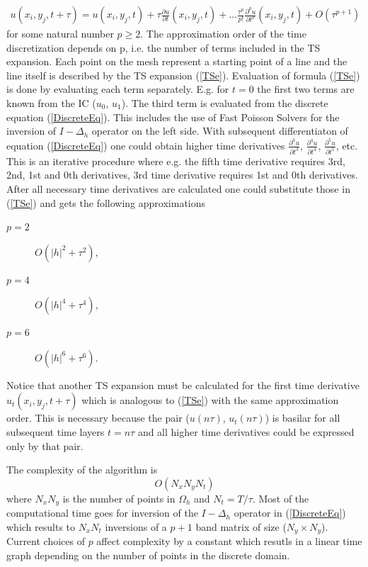 \documentclass[%
 aip,
cp,  %
 amsmath,amssymb,%
 reprint,%
]{revtex4-2}
\newcommand{\rf}[1]{(\ref{#1})}
\begin{document}
\begin{align} \label{TSe}
u(x_i, y_j, t+\tau) = u(x_i, y_j, t) + \tau \frac{ \partial u }{ \partial t }(x_i, y_j, t)  + ... 
\frac{ \tau^p }{ p! } \frac{ \partial^p u }{ \partial t^p }(x_i, y_j, t) + O(\tau^{p+1})
\end{align}
for some natural number $p \ge 2$. The approximation order of the time discretization depends on p, i.e. the number of terms included in the TS expansion. Each point on the mesh represent a starting point of a line and the line itself is described by the TS expansion \rf{TSe}. Evaluation of formula \rf{TSe} is done by evaluating each term separately. E.g. for $t=0$ the first two terms are known from the IC ($u_0$, $u_1$). The third term is evaluated from the discrete equation \rf{DiscreteEq}. This includes the use of Fast Poisson Solvers for the inversion of $I-\Delta_h$ operator on the left side. With subsequent differentiaton of equation \rf{DiscreteEq} one could obtain higher time derivatives $\frac{\partial^3 u}{\partial t^3}$, $\frac{\partial^4 u}{\partial t^4}$, $\frac{\partial^5 u}{\partial t^5}$, etc. This is an iterative procedure where e.g. the fifth time derivative requires 3rd, 2nd, 1st and 0th derivatives, 3rd time derivative requires 1st and 0th derivatives. After all necessary time derivatives are calculated one could substitute those in \rf{TSe} and gets the following approximations
\begin{description}
 \item[$p=2$] $O(|h|^2 + \tau^2)$,
 \item[$p=4$] $O(|h|^4 + \tau^4)$,
 \item[$p=6$] $O(|h|^6 + \tau^6)$.
\end{description}
Notice that another TS expansion must be calculated for the first time derivative $u_t(x_i, y_j, t+\tau)$ which is analogous to \rf{TSe} with the same approximation order. This is necessary because the pair ($u(n\tau)$, $u_t(n\tau)$) is basilar for all subsequent time layers $t=n\tau$ and all higher time derivatives could be expressed only by that pair.

The complexity of the algorithm is
$$ O( N_x N_y N_t ) $$
where $N_x N_y$ is the number of points in $\Omega_h$ and $N_t = T/\tau$. Most of the computational time goes for inversion of the $I-\Delta_h$ operator in \rf{DiscreteEq} which results to $N_x N_t$ inversions of a $p+1$ band matrix of size ($N_y \times N_y$). Current choices of $p$ affect complexity by a constant which resutls in a linear time graph depending on the number of points in the discrete domain.
\end{document}

